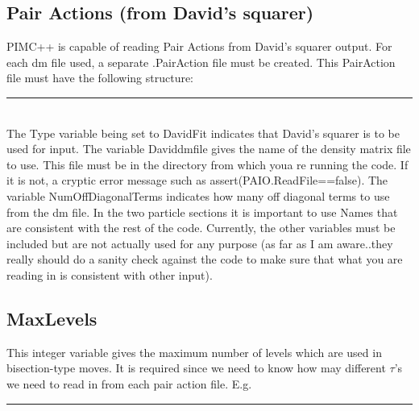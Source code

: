 \documentclass{book}
\begin{document}
\subsection{Pair Actions (from David's squarer)}
PIMC++ is capable of reading Pair Actions from David's squarer output.
For each dm file used, a separate .PairAction file must be created.
This PairAction file must have the following structure:\\
\rule{0.0cm}{0.75cm}\rule{0.6cm}{0cm}\\
The Type variable being set to DavidFit indicates that David's squarer
is to be used for input.  The variable Daviddmfile gives the name of
the density matrix file to use.  This file must be in the directory
from which youa re running the code. If it is not, a cryptic error
message such as assert(PAIO.ReadFile==false).  The variable
NumOffDiagonalTerms indicates how many off diagonal terms to use from
the dm file.  In the two particle sections it is important to use
Names that are consistent with the rest of the code. Currently, the
other variables must be included but are not actually used for any
purpose (as far as I am aware..they really should do a sanity check
against the code to make sure that what you are reading in is
consistent with other input).

\subsection{MaxLevels}
This integer variable gives the maximum number of levels which are
used in bisection-type moves.  It is required since we need to know
how may different $\tau$'s we need to read in from each pair action
file.  E.g.\\
\rule{0.6cm}{0cm}
\end{document}
